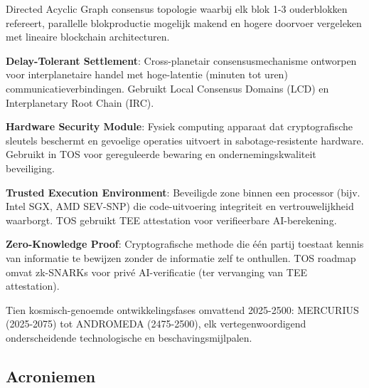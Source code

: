 \documentclass[11pt]{article}
\begin{document}
\begin{description}[leftmargin=3cm, style=nextline]
  \item[BlockDAG] Directed Acyclic Graph consensus topologie waarbij elk blok 1-3 ouderblokken refereert, parallelle blokproductie mogelijk makend en hogere doorvoer vergeleken met lineaire blockchain architecturen.

  \item[DT-Settlement] \textbf{Delay-Tolerant Settlement}: Cross-planetair consensusmechanisme ontworpen voor interplanetaire handel met hoge-latentie (minuten tot uren) communicatieverbindingen. Gebruikt Local Consensus Domains (LCD) en Interplanetary Root Chain (IRC).

  \item[HSM] \textbf{Hardware Security Module}: Fysiek computing apparaat dat cryptografische sleutels beschermt en gevoelige operaties uitvoert in sabotage-resistente hardware. Gebruikt in TOS voor gereguleerde bewaring en ondernemingskwaliteit beveiliging.

  \item[TEE] \textbf{Trusted Execution Environment}: Beveiligde zone binnen een processor (bijv. Intel SGX, AMD SEV-SNP) die code-uitvoering integriteit en vertrouwelijkheid waarborgt. TOS gebruikt TEE attestation voor verifieerbare AI-berekening.

  \item[ZK Proof] \textbf{Zero-Knowledge Proof}: Cryptografische methode die één partij toestaat kennis van informatie te bewijzen zonder de informatie zelf te onthullen. TOS roadmap omvat zk-SNARKs voor privé AI-verificatie (ter vervanging van TEE attestation).

  \item[Celestial Eras] Tien kosmisch-genoemde ontwikkelingsfases omvattend 2025-2500: MERCURIUS (2025-2075) tot ANDROMEDA (2475-2500), elk vertegenwoordigend onderscheidende technologische en beschavingsmijlpalen.
\end{description}

\subsection*{Acroniemen}
\end{document}
